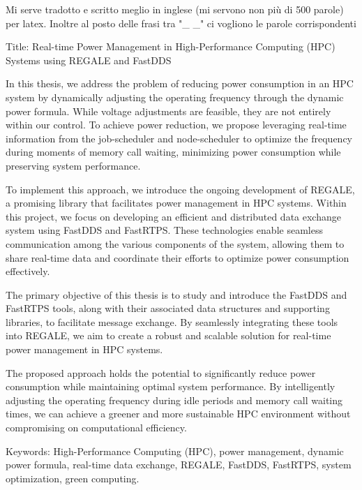 Mi serve tradotto e scritto meglio in inglese (mi servono non più di 500 parole) per latex. Inoltre al posto delle frasi tra "_ _" ci vogliono le parole corrispondenti


Title: Real-time Power Management in High-Performance Computing (HPC) Systems using REGALE and FastDDS

In this thesis, we address the problem of reducing power consumption in an HPC system by dynamically adjusting the operating frequency through the dynamic power formula. While voltage adjustments are feasible, they are not entirely within our control. To achieve power reduction, we propose leveraging real-time information from the job-scheduler and node-scheduler to optimize the frequency during moments of memory call waiting, minimizing power consumption while preserving system performance.

To implement this approach, we introduce the ongoing development of REGALE, a promising library that facilitates power management in HPC systems. Within this project, we focus on developing an efficient and distributed data exchange system using FastDDS and FastRTPS. These technologies enable seamless communication among the various components of the system, allowing them to share real-time data and coordinate their efforts to optimize power consumption effectively.

The primary objective of this thesis is to study and introduce the FastDDS and FastRTPS tools, along with their associated data structures and supporting libraries, to facilitate message exchange. By seamlessly integrating these tools into REGALE, we aim to create a robust and scalable solution for real-time power management in HPC systems.

The proposed approach holds the potential to significantly reduce power consumption while maintaining optimal system performance. By intelligently adjusting the operating frequency during idle periods and memory call waiting times, we can achieve a greener and more sustainable HPC environment without compromising on computational efficiency.

Keywords: High-Performance Computing (HPC), power management, dynamic power formula, real-time data exchange, REGALE, FastDDS, FastRTPS, system optimization, green computing.
